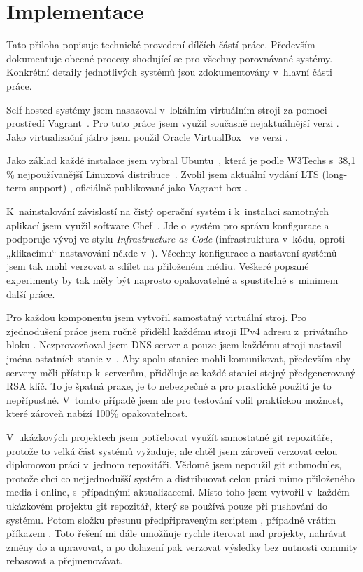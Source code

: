 \chapter{Implementace}\label{ch:implementace}

Tato příloha popisuje technické provedení dílčích částí práce. Především dokumentuje obecné procesy shodující se pro všechny porovnávané \CICD systémy. Konkrétní detaily jednotlivých systémů jsou zdokumentovány v~hlavní části práce.

Self-hosted \CICD systémy jsem nasazoval v~lokálním virtuálním stroji za pomoci prostředí Vagrant~\cite{hashimoto-vagrant,susanka-vagrant}. Pro tuto práce jsem využil současně nejaktuálnější verzi . Jako virtualizační jádro jsem použil Oracle VirtualBox~\cite{virtualbox} ve verzi .

Jako základ každé instalace jsem vybral Ubuntu~\cite{ubuntu}, která je podle W3Techs s~38,1 \% nejpoužívanější Linuxová distribuce~\cite{w3techs-stats}. Zvolil jsem aktuální vydání LTS (long-term support) , oficiálně publikované jako Vagrant box .

K~nainstalování závislostí na čistý operační systém i k~instalaci samotných aplikací jsem využil software Chef~\cite{chef}. Jde o~systém pro správu konfigurace a podporuje vývoj ve stylu \textit{Infrastructure as Code} (infrastruktura v~kódu, oproti „klikacímu“ nastavování někde v~). Všechny konfigurace a nastavení systémů jsem tak mohl verzovat a sdílet na přiloženém médiu. Veškeré popsané experimenty by tak měly být naprosto opakovatelné a spustitelné s~minimem další práce.

Pro každou komponentu jsem vytvořil samostatný virtuální stroj. Pro zjednodušení práce jsem ručně přidělil každému stroji IPv4 adresu z~privátního bloku . Nezprovozňoval jsem DNS server a pouze jsem každému stroji nastavil jména ostatních stanic v~. Aby spolu stanice mohli komunikovat, především aby \CD servery měli přístup k~\HTTP serverům, přiděluje se každé stanici stejný předgenerovaný RSA klíč. To je špatná praxe, je to nebezpečné a pro praktické použití je to nepřípustné. V~tomto případě jsem ale pro testování volil praktickou možnost, které zároveň nabízí 100\% opakovatelnost.

V~ukázkových projektech jsem potřebovat využít samostatné git repozitáře, protože to velká část \CICD systémů vyžaduje, ale chtěl jsem zároveň verzovat celou diplomovou práci v~jednom repozitáři. Vědomě jsem nepoužil git submodules, protože chci co nejjednodušší systém a distribuovat celou práci mimo přiloženého media i online, s~případnými aktualizacemi. Místo toho jsem vytvořil v~každém ukázkovém projektu git repozitář, který se používá pouze při pushování do \CICD systému. Potom složku  přesunu předpřipraveným scriptem , případně vrátím příkazem . Toto řešení mi dále umožňuje rychle iterovat nad projekty, nahrávat změny do \CICD a upravovat, a po dolazení pak verzovat výsledky bez nutnosti commity rebasovat a přejmenovávat.

